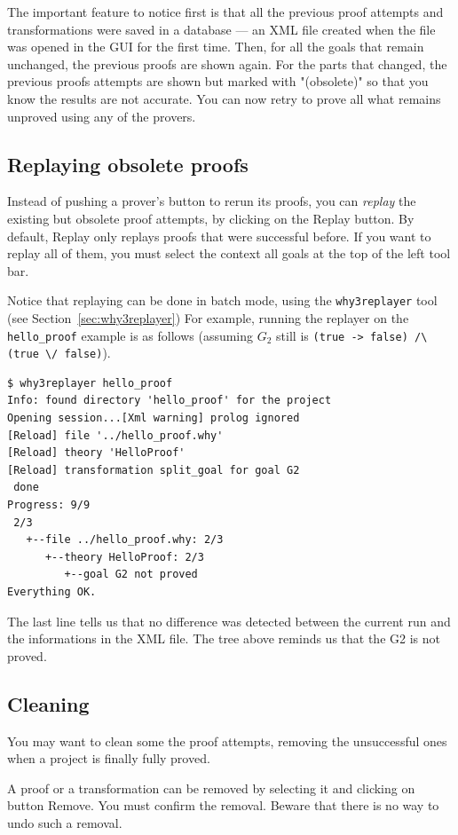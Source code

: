 The important feature to notice first is that all the previous proof
attempts and transformations were saved in a database --- an XML file
created when the \why file was opened in the GUI for the first
time. Then, for all the goals that remain unchanged, the previous
proofs are shown again. For the parts that changed, the previous
proofs attempts are shown but marked with "(obsolete)"
so that you
know the results are not accurate. You can now retry to prove all what
remains unproved using any of the provers.

\subsection{Replaying obsolete proofs}

Instead of pushing a prover's button to rerun its proofs, you can
\emph{replay} the existing but obsolete
proof attempts, by clicking on
the \textsf{Replay} button. By default, \textsf{Replay} only replays
proofs that were successful before. If you want to replay all of them,
you must select the context \textsf{all goals} at the top of the left
tool bar.

Notice that replaying can be done in batch mode, using the
\texttt{why3replayer} tool (see Section~\ref{sec:why3replayer}) For
example, running the replayer on the \texttt{hello\_proof} example is
as follows (assuming $G_2$ still is
\lstinline{(true -> false) /\ (true \/ false)}).
\begin{verbatim}
$ why3replayer hello_proof
Info: found directory 'hello_proof' for the project
Opening session...[Xml warning] prolog ignored
[Reload] file '../hello_proof.why'
[Reload] theory 'HelloProof'
[Reload] transformation split_goal for goal G2
 done
Progress: 9/9
 2/3
   +--file ../hello_proof.why: 2/3
      +--theory HelloProof: 2/3
         +--goal G2 not proved
Everything OK.
\end{verbatim}
The last line tells us that no difference was detected between the
current run and the informations in the XML file. The tree above
reminds us that the G2 is not proved.

\subsection{Cleaning}

You may want to clean some the proof attempts, \eg removing the
unsuccessful ones when a project is finally fully proved.

A proof or a transformation can be removed by selecting it and
clicking on button \textsf{Remove}. You must confirm the
removal. Beware that there is no way to undo such a removal.

